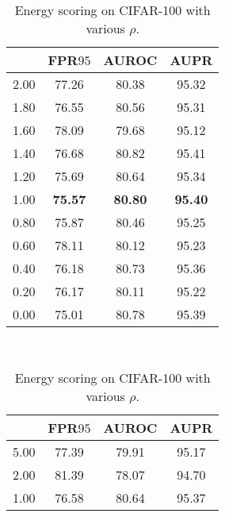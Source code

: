 \documentclass{article}
\begin{document}
\begin{table}[t]
\centering
\parbox{.30\linewidth}{
\centering
\scriptsize
\caption{Energy scoring on CIFAR-$100$ with various $\sigma_1$.} \label{tab: ablation sigma full cifar100}
\vspace{5pt}
{
\begin{tabular}{c|ccc}
\toprule[1.5pt]
            & FPR$95$     & AUROC       & AUPR      \\
\midrule[0.6pt]
2.00               & 77.26                  & 80.38                  & 95.32 \\
1.80               & 76.55                  & 80.56                  & 95.31 \\
1.60               & 78.09                  & 79.68                  & 95.12 \\
1.40               & 76.68                  & 80.82                  & 95.41 \\
1.20               & 75.69                  & 80.64                  & 95.34 \\ 
\cellcolor{greyC}1.00               & \cellcolor{greyC}\textbf{75.57}                  & \cellcolor{greyC}\textbf{80.80}                  & \cellcolor{greyC}\textbf{95.40} \\ 
0.80               & 75.87                  & 80.46                  & 95.25 \\
0.60               & 78.11                  & 80.12                  & 95.23 \\
0.40               & 76.18                  & 80.73                  & 95.36 \\
0.20               & 76.17                  & 80.11                  & 95.22 \\
0.00               & 75.01                  & 80.78                  & 95.39 \\
\bottomrule[1.5pt]      
\end{tabular}
}}~~
\parbox{.30\linewidth}{
\centering
\caption{Energy scoring on CIFAR-100 with various $\rho$.} 
\scriptsize
\vspace{5pt}
{
\begin{tabular}{c|ccc}
\toprule[1.5pt]
           & FPR$95$     & AUROC      & AUPR      \\
\midrule[0.6pt]
5.00               & 77.39                  & 79.91                  & 95.17 \\
2.00               & 81.39                  & 78.07                  & 94.70 \\
1.00               & 76.58                  & 80.64                  & 95.37 \\

\end{tabular}}}
\end{table}
\end{document}

